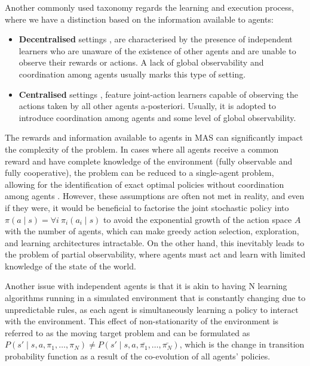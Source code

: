 \documentclass[a4paper,singleside,12pt]{report} %
\begin{document}
Another commonly used taxonomy regards the learning and execution process, where we have a distinction based on the information available to agents:

\begin{itemize}
\item
  \textbf{Decentralised} settings \cite{Bowling2002MultiagentLU, kapetanakis2002reinforcement}, are characterised by the presence of independent learners who are unaware of the existence of other agents and are unable to observe their rewards or actions. A lack of global observability and coordination among agents usually marks this type of setting.
\item
  \textbf{Centralised} settings \cite{hu2003nash, littman2001friend}, feature joint-action learners capable of observing the actions taken by all other agents a-posteriori. Usually, it is adopted to introduce coordination among agents and some level of global observability.
\end{itemize}

The rewards and information available to agents in MAS can significantly impact the complexity of the problem. In cases where all agents receive a common reward and have complete knowledge of the environment (fully observable and fully cooperative), the problem can be reduced to a single-agent problem, allowing for the identification of exact optimal policies without coordination among agents \cite{HernandezLeal2017ASO}. However, these assumptions are often not met in reality, and even if they were, it would be beneficial to factorise the joint stochastic policy into ${\pi(a \mid s) = \forall i\ \pi_i (a_i \mid s)}$ to avoid the exponential growth of the action space $A$ with the number of agents, which can make greedy action selection, exploration, and learning architectures intractable. On the other hand, this inevitably leads to the problem of partial observability, where agents must act and learn with limited knowledge of the state of the world. 

Another issue with independent agents is that it is akin to having N learning algorithms running in a simulated environment that is constantly changing due to unpredictable rules, as each agent is simultaneously learning a policy to interact with the environment. This effect of non-stationarity of the environment is referred to as the moving target problem and can be formulated as \(P(s' \mid s, a, \pi_1, \dots, \pi_N) \neq P(s' \mid s, a, \bar{\pi_1}, \dots, \bar{\pi_N})\), which is the change in transition probability function as a result of the co-evolution of all agents' policies.
\end{document}
